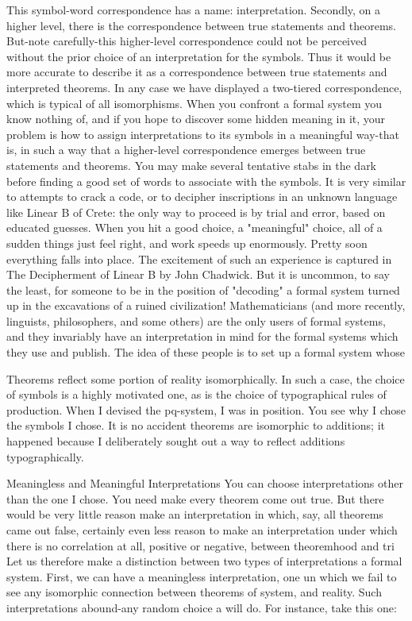 This symbol-word correspondence has a name: interpretation. Secondly, on a higher level, there is the correspondence between true statements and theorems. But-note carefully-this higher-level correspondence could not be perceived without the prior choice of an interpretation for the symbols. Thus it would be more accurate to describe it as a correspondence between true statements and interpreted theorems. In any case we have displayed a two-tiered correspondence, which is typical of all isomorphisms. When you confront a formal system you know nothing of, and if you hope to discover some hidden meaning in it, your problem is how to assign interpretations to its symbols in a meaningful way-that is, in such a way that a higher-level correspondence emerges between true statements and theorems. You may make several tentative stabs in the dark before finding a good set of words to associate with the symbols. It is very similar to attempts to crack a code, or to decipher inscriptions in an unknown language like Linear B of Crete: the only way to proceed is by trial and error, based on educated guesses. When you hit a good choice, a "meaningful" choice, all of a sudden things just feel right, and work speeds up enormously. Pretty soon everything falls into place. The excitement of such an experience is captured in The Decipherment of Linear B by John Chadwick. But it is uncommon, to say the least, for someone to be in the position of "decoding" a formal system turned up in the excavations of a ruined civilization! Mathematicians (and more recently, linguists, philosophers, and some others) are the only users of formal systems, and they invariably have an interpretation in mind for the formal systems which they use and publish. The idea of these people is to set up a formal system whose 







Theorems reflect some portion of reality isomorphically. In such a case, the choice of symbols is a highly motivated one, as is the choice of typographical rules of production. When I devised the pq-system, I was in position. You see why I chose the symbols I chose. It is no accident theorems are isomorphic to additions; it happened because I deliberately sought out a way to reflect additions typographically. 

Meaningless and Meaningful Interpretations You can choose interpretations other than the one I chose. You need make every theorem come out true. But there would be very little reason make an interpretation in which, say, all theorems came out false, certainly even less reason to make an interpretation under which there is no correlation at all, positive or negative, between theoremhood and tri Let us therefore make a distinction between two types of interpretations a formal system. First, we can have a meaningless interpretation, one un which we fail to see any isomorphic connection between theorems of system, and reality. Such interpretations abound-any random choice a will do. For instance, take this one: 

